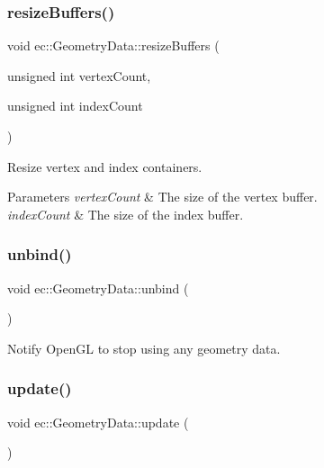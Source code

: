 \subsubsection{\texorpdfstring{resize\+Buffers()}{resizeBuffers()}}
{\footnotesize\ttfamily void ec\+::\+Geometry\+Data\+::resize\+Buffers (\begin{DoxyParamCaption}\item[{unsigned int}]{vertex\+Count,  }\item[{unsigned int}]{index\+Count }\end{DoxyParamCaption})}



Resize vertex and index containers. 


\begin{DoxyParams}{Parameters}
{\em vertex\+Count} & The size of the vertex buffer. \\
\hline
{\em index\+Count} & The size of the index buffer. \\
\hline
\end{DoxyParams}
\mbox{\label{classec_1_1_geometry_data_abb54af4b2922eb16973b450d6cf0beae}} 
\subsubsection{\texorpdfstring{unbind()}{unbind()}}
{\footnotesize\ttfamily void ec\+::\+Geometry\+Data\+::unbind (\begin{DoxyParamCaption}{ }\end{DoxyParamCaption})}



Notify Open\+GL to stop using any geometry data. 

\mbox{\label{classec_1_1_geometry_data_ad8edfa8a7fda52850f072ab845ef38fd}} 
\subsubsection{\texorpdfstring{update()}{update()}}
{\footnotesize\ttfamily void ec\+::\+Geometry\+Data\+::update (\begin{DoxyParamCaption}{ }\end{DoxyParamCaption})}



